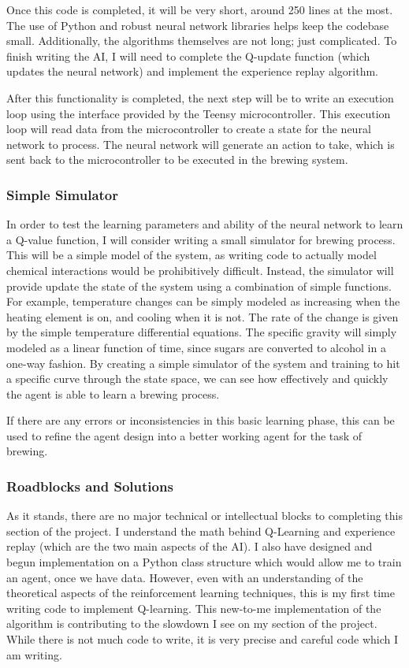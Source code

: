 \documentclass[draftclsnofoot,onecolumn,letterpaper,10pt]{IEEEtran}
\begin{document}
Once this code is completed, it will be very short, around 250 lines at the most. The use of Python and robust neural network libraries helps keep the codebase small. Additionally, the algorithms themselves are not long; just complicated.
To finish writing the AI, I will need to complete the Q-update function (which updates the neural network) and implement the experience replay algorithm.

After this functionality is completed, the next step will be to write an execution loop using the interface provided by the Teensy microcontroller.
This execution loop will read data from the microcontroller to create a state for the neural network to process.
The neural network will generate an action to take, which is sent back to the microcontroller to be executed in the brewing system.

\subsubsection{Simple Simulator}
In order to test the learning parameters and ability of the neural network to learn a Q-value function, I will consider writing a small simulator for brewing process.
This will be a simple model of the system, as writing code to actually model chemical interactions would be prohibitively difficult.
Instead, the simulator will provide update the state of the system using a combination of simple functions.
For example, temperature changes can be simply modeled as increasing when the heating element is on, and cooling when it is not.
The rate of the change is given by the simple temperature differential equations.
The specific gravity will simply modeled as a linear function of time, since sugars are converted to alcohol in a one-way fashion.
By creating a simple simulator of the system and training to hit a specific curve through the state space, we can see how effectively and quickly the agent is able to learn a brewing process.

If there are any errors or inconsistencies in this basic learning phase, this can be used to refine the agent design into a better working agent for the task of brewing.

\subsubsection{Roadblocks and Solutions}
As it stands, there are no major technical or intellectual blocks to completing this section of the project.
I understand the math behind Q-Learning and experience replay (which are the two main aspects of the AI).
I also have designed and begun implementation on a Python class structure which would allow me to train an agent, once we have data.
However, even with an understanding of the theoretical aspects of the reinforcement learning techniques, this is my first time writing code to implement Q-learning.
This new-to-me implementation of the algorithm is contributing to the slowdown I see on my section of the project.
While there is not much code to write, it is very precise and careful code which I am writing.
\end{document}
